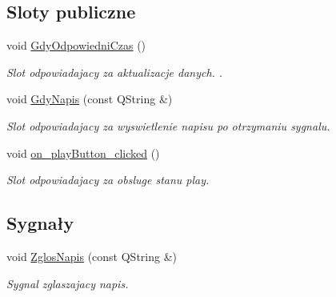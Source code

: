 \subsection*{Sloty publiczne}
\begin{DoxyCompactItemize}
\item 
void \hyperlink{class_okno_glowne_a2a49d3696ef8a42325313842768f2c92}{Gdy\+Odpowiedni\+Czas} ()
\begin{DoxyCompactList}\small\item\em Slot odpowiadajacy za aktualizacje danych. . \end{DoxyCompactList}\item 
void \hyperlink{class_okno_glowne_a2a59f13292adfead4ac821780220044a}{Gdy\+Napis} (const Q\+String \&)
\begin{DoxyCompactList}\small\item\em Slot odpowiadajacy za wyswietlenie napisu po otrzymaniu sygnalu. \end{DoxyCompactList}\item 
void \hyperlink{class_okno_glowne_ac837b1f8c8b0288d07987e059966431b}{on\+\_\+play\+Button\+\_\+clicked} ()
\begin{DoxyCompactList}\small\item\em Slot odpowiadajacy za obsluge stanu play. \end{DoxyCompactList}\end{DoxyCompactItemize}
\subsection*{Sygnały}
\begin{DoxyCompactItemize}
\item 
void \hyperlink{class_okno_glowne_aa602a0c5a940f0af4ab7390bfc1a4b9d}{Zglos\+Napis} (const Q\+String \&)
\begin{DoxyCompactList}\small\item\em Sygnal zglaszajacy napis. \end{DoxyCompactList}\end{DoxyCompactItemize}

